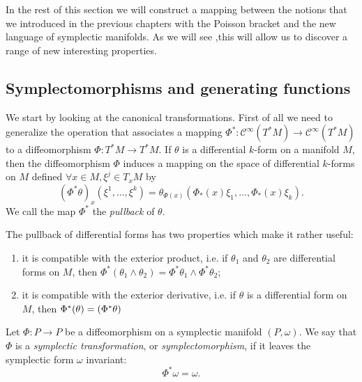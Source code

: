 \documentclass[english,fontsize=11pt,paper=a5,oneside]{scrbook}
\newcommand{\cC}{\mathcal{C}}
\let\d\relax
\DeclareMathOperator{\d}{d}
\theoremstyle{definition}
\begin{document}
In the rest of this section we will construct a mapping between the notions that we introduced in the previous chapters with the Poisson bracket and the new language of symplectic manifolds.
As we will see ,this will allow us to discover a range of new interesting properties.

\subsection{Symplectomorphisms and generating functions}

We start by looking at the canonical transformations. First of all we need to generalize the operation that associates a mapping $\Phi^* : \cC^\infty(T^*M) \to \cC^\infty(T^*M)$ to a diffeomorphism $\Phi: T^*M \to T^*M$.
%
If $\theta$ is a differential $k$-form on a manifold $M$, then the diffeomorphism $\Phi$ induces a mapping on the space of differential $k$-forms on $M$ defined $\forall x\in M, \xi^j\in T_xM$ by
\begin{equation}
    (\Phi^{*}\theta)_{x}(\xi^{1},\ldots ,\xi^{k})=\theta_{\Phi(x)}(\Phi_*(x)\xi_{1},\ldots,\Phi_*(x)\xi_{k}).
\end{equation}
We call the map $\Phi^*$ the \emph{pullback} of $\theta$.

The pullback of differential forms has two properties which make it rather useful:
\begin{enumerate}
    \item it is compatible with the exterior product, i.e. if $\theta_1$ and $\theta_2$ are differential forms on $M$, then $\Phi^{*}(\theta_1 \wedge \theta_2) = \Phi^{*}\theta_1 \wedge \Phi^{*}\theta_2$;
    \item it is compatible with the exterior derivative, i.e. if $\theta$ is a differential form on $M$, then $\Phi^{*}(\d\theta) = \d(\Phi^{*}\theta)$
\end{enumerate}

\begin{tcolorbox}
    Let $\Phi: P \to P$ be a diffeomorphism on a symplectic manifold $(P,\omega)$.
    We say that $\Phi$ is a \emph{symplectic transformation}, or \emph{symplectomorphism}, if it leaves the symplectic form $\omega$ invariant:
    \begin{equation}\label{eq:symplectomorphism}
        \Phi^* \omega = \omega.
    \end{equation}
\end{tcolorbox}
\end{document}
